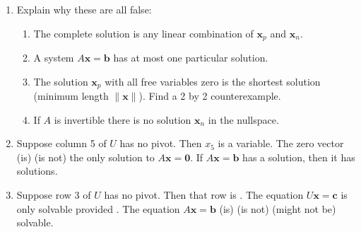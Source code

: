 \documentclass[14pt, a4paper]{article}
\begin{document}
\begin{enumerate}[resume]
    \item Explain why these are all false:
          \begin{enumerate}
              \item The complete solution is any linear combination of $\mathbf{x}_p$ and $\mathbf{x}_n$.
              \item A system $A\mathbf{x} = \mathbf{b}$ has at most one particular solution.
              \item The solution $\mathbf{x}_p$ with all free variables zero is the shortest solution (minimum length $\|\mathbf{x}\|$). Find a 2 by 2 counterexample.
              \item If $A$ is invertible there is no solution $\mathbf{x}_n$ in the nullspace.
          \end{enumerate}

    \item Suppose column 5 of $U$ has no pivot. Then $x_5$ is a \underline{\hspace{2cm}} variable. The zero vector (is) (is not) the only solution to $A\mathbf{x} = \mathbf{0}$. If $A\mathbf{x} = \mathbf{b}$ has a solution, then it has \underline{\hspace{2cm}} solutions.

    \item Suppose row 3 of $U$ has no pivot. Then that row is \underline{\hspace{2cm}}. The equation $U\mathbf{x} = \mathbf{c}$ is only solvable provided \underline{\hspace{2cm}}. The equation $A\mathbf{x} = \mathbf{b}$ (is) (is not) (might not be) solvable.


\end{enumerate}
\end{document}
